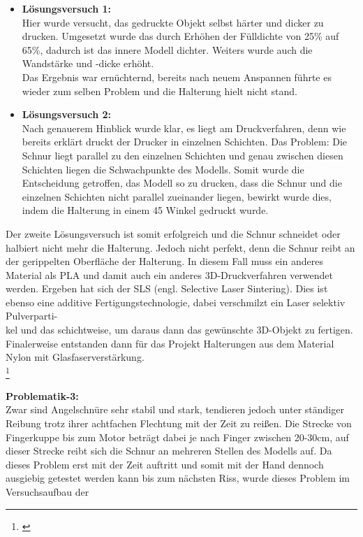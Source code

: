 \documentclass[titlepage,12pt,twoside]{article}
\begin{document}
\begin{itemize}
	\item \textbf{Lösungsversuch 1:} \\
	Hier wurde versucht, das gedruckte Objekt selbst härter und dicker zu drucken. Umgesetzt wurde das durch Erhöhen der Fülldichte von 25\% auf 65\%, dadurch ist das innere Modell dichter. Weiters wurde auch die Wandstärke 
	und -dicke erhöht. \\
	Das Ergebnis war ernüchternd, bereits nach neuem Anspannen führte es wieder zum selben Problem und die Halterung hielt nicht stand.
	\item \textbf{Lösungsversuch 2:} \\
	Nach genauerem Hinblick wurde klar, es liegt am Druckverfahren, denn wie bereits erklärt druckt der Drucker in einzelnen Schichten. Das Problem: Die Schnur liegt parallel zu den einzelnen Schichten und genau zwischen diesen Schichten 
	liegen die Schwachpunkte des Modells. Somit wurde die Entscheidung getroffen, das Modell so zu drucken, dass die Schnur und die einzelnen Schichten nicht parallel zueinander liegen, bewirkt wurde dies, indem die Halterung in einem 45\textdegree 
	Winkel gedruckt wurde.
\end{itemize}
\hfill \break
Der zweite Lösungsversuch ist somit erfolgreich und die Schnur schneidet oder halbiert nicht mehr die Halterung. Jedoch nicht perfekt, denn die Schnur reibt an der gerippelten Oberfläche der Halterung. In diesem Fall muss ein anderes Material als 
PLA und damit auch ein anderes 3D-Druckverfahren verwendet werden. Ergeben hat sich der SLS (engl. Selective Laser Sintering). Dies ist ebenso eine additive Fertigungstechnologie, dabei verschmilzt ein Laser selektiv Pulverparti-\\kel und das 
schichtweise, um daraus dann das gewünschte 3D-Objekt zu fertigen. Finalerweise entstanden dann für das Projekt Halterungen aus dem Material Nylon mit Glasfaserverstärkung. \\ \footnote{\cite{sls3D}} \\
\\
\textbf{Problematik-3:} \\
Zwar sind Angelschnüre sehr stabil und stark, tendieren jedoch unter ständiger Reibung trotz ihrer achtfachen Flechtung mit der Zeit zu reißen. Die Strecke von Fingerkuppe bis zum Motor beträgt dabei je nach Finger zwischen 20-30cm, 
auf dieser Strecke reibt sich die Schnur an mehreren Stellen des Modells auf. Da dieses Problem erst mit der Zeit auftritt und somit mit der Hand dennoch ausgiebig getestet werden kann bis zum nächsten Riss, wurde dieses Problem im Versuchsaufbau der 
\end{document}
